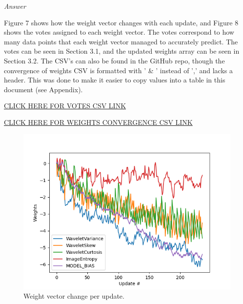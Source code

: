 \documentclass[12pt, fullpage,letterpaper]{article}
\begin{document}
\begin{enumerate}
\begin{enumerate}
	\emph{Answer}
	
	Figure 7 shows how the weight vector changes with each update, and Figure 8 shows the votes assigned to each weight vector. The votes correspond to how many data points that each weight vector managed to accurately predict. The votes can be seen in Section 3.1, and the updated weights array can be seen in Section 3.2. The CSV's can also be found in the GitHub repo, though the convergence of weights CSV is formatted with ' \& ' instead of ',' and lacks a header. This was done to make it easier to copy values into a table in this document (see Appendix).
	
	\href{https://github.com/Paul-Wissler/cs-6350-hw3/blob/main/Instructions/q2b_votes.csv}{CLICK HERE FOR VOTES CSV LINK}
	
	\href{https://github.com/Paul-Wissler/cs-6350-hw3/blob/main/Instructions/q2b_weights_convergence.csv}{CLICK HERE FOR WEIGHTS CONVERGENCE CSV LINK}
	
	\begin{figure}[htp]
        \centering
        \includegraphics[width=12cm]{q2b_weights_convergence.png}
        \caption{Weight vector change per update.}
        \label{fig:q2b_weights}
    \end{figure}
    

\end{enumerate}
\end{enumerate}
\end{document}
